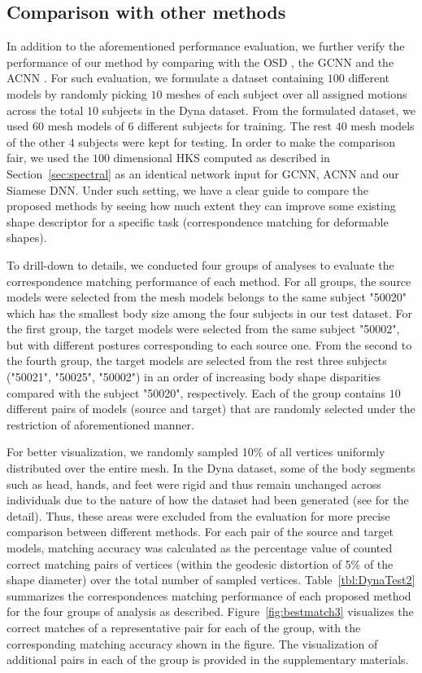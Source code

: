 \documentclass[5p,twocolumn,10pt,times]{elsarticle}
\begin{document}
\subsection{Comparison with other methods}

\label{sec:4}
In addition to the aforementioned performance evaluation, we further verify the performance of our method by comparing with the OSD \cite{litman2014learning}, the GCNN \cite{Masci_2015_ICCV_Workshops} and the ACNN \cite{boscaini2016learning}. For such evaluation, we formulate a dataset containing $100$ different models by randomly picking $10$ meshes of each subject over all assigned motions across the total $10$ subjects in the Dyna dataset. From the formulated dataset, we used $60$ mesh models of 6 different subjects for training. The rest $40$ mesh models of the other $4$ subjects were kept for testing. In order to make the comparison fair, we used the $100$ dimensional HKS computed as described in Section~\ref{sec:spectral} as an identical network input for GCNN, ACNN and our Siamese DNN. Under such setting, we have a clear guide to compare the proposed methods by seeing how much extent they can improve some existing shape descriptor for a specific task (correspondence matching for deformable shapes).

To drill-down to details, we conducted four groups of analyses to evaluate the correspondence matching performance of each method. For all groups, the source models were selected from the mesh models belongs to the same subject "50020" which has the smallest body size among the four subjects in our test dataset. For the first group, the target models were selected from the same subject "50002", but with different postures corresponding to each source one. From the second to the fourth group, the target models are selected from the rest three subjects ("50021", "50025", "50002") in an order of increasing body shape disparities compared with the subject "50020", respectively. Each of the group contains $10$ different pairs of models (source and target) that are randomly selected under the restriction of aforementioned manner. 

For better visualization, we randomly sampled 10\% of all vertices uniformly distributed over the entire mesh. In the Dyna dataset, some of the body segments such as head, hands, and feet were rigid and thus remain unchanged across individuals due to the nature of how the dataset had been generated (see \cite{Dyna} for the detail). Thus, these areas were excluded from the evaluation for more precise comparison between different methods. For each pair of the source and target models, matching accuracy was calculated as the percentage value of counted correct matching pairs of vertices (within the geodesic distortion of 5\% of the shape diameter) over the total number of sampled vertices. Table~\ref{tbl:DynaTest2} summarizes the correspondences matching performance of each proposed method for the four groups of analysis as described. Figure~\ref{fig:bestmatch3} visualizes the correct matches of a representative pair for each of the group, with the corresponding matching accuracy shown in the figure. The visualization of additional pairs in each of the group is provided in the supplementary materials.
\end{document}
